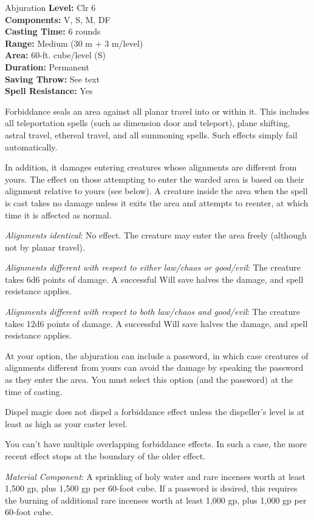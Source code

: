 {Abjuration}
{
	\textbf{Level:}
	Clr 6\\
	\textbf{Components:}
	V, S, M, DF\\
	\textbf{Casting Time:}
	6 rounds\\
	\textbf{Range:}
	Medium (30 m + 3 m/level)\\
	\textbf{Area:}
	60-ft. cube/level (S)\\
	\textbf{Duration:}
	Permanent\\
	\textbf{Saving Throw:}
	See text\\
	\textbf{Spell Resistance:}
	Yes\\
}
{
	Forbiddance seals an area against all planar travel into or within it. This includes all teleportation spells (such as dimension door and teleport), plane shifting, astral travel, ethereal travel, and all summoning spells. Such effects simply fail automatically.

	In addition, it damages entering creatures whose alignments are different from yours. The effect on those attempting to enter the warded area is based on their alignment relative to yours (see below). A creature inside the area when the spell is cast takes no damage unless it exits the area and attempts to reenter, at which time it is affected as normal.

	\textit{Alignments identical}:
	No effect. The creature may enter the area freely (although not by planar travel).

	\textit{Alignments different with respect to either law/chaos or good/evil}:
	The creature takes 6d6 points of damage. A successful Will save halves the damage, and spell resistance applies.

	\textit{Alignments different with respect to both law/chaos and good/evil}:
	The creature takes 12d6 points of damage. A successful Will save halves the damage, and spell resistance applies.

	At your option, the abjuration can include a password, in which case creatures of alignments different from yours can avoid the damage by speaking the password as they enter the area. You must select this option (and the password) at the time of casting.

Dispel magic does not dispel a forbiddance effect unless the dispeller's level is at least as high as your caster level.

	You can't have multiple overlapping forbiddance effects. In such a case, the more recent effect stops at the boundary of the older effect.

	\textit{Material Component}:
	A sprinkling of holy water and rare incenses worth at least 1,500 gp, plus 1,500 gp per 60-foot cube. If a password is desired, this requires the burning of additional rare incenses worth at least 1,000 gp, plus 1,000 gp per 60-foot cube.

}
